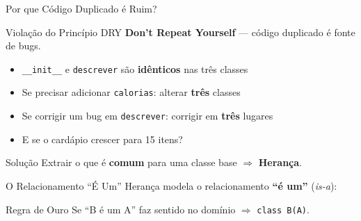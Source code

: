 \documentclass[aspectratio=169]{beamer}
\begin{document}
\begin{frame}{Por que Código Duplicado é Ruim?}
  \begin{alertblock}{Violação do Princípio DRY}
    \textbf{Don't Repeat Yourself} --- código duplicado é fonte de bugs.
  \end{alertblock}

  \bigskip

  \begin{itemize}
    \item \texttt{\_\_init\_\_} e \texttt{descrever} são \textbf{idênticos} nas três classes
    \item Se precisar adicionar \texttt{calorias}: alterar \textbf{três} classes
    \item Se corrigir um bug em \texttt{descrever}: corrigir em \textbf{três} lugares
    \item E se o cardápio crescer para 15 itens?
  \end{itemize}

  \bigskip

  \begin{exampleblock}{Solução}
    Extrair o que é \textbf{comum} para uma classe base $\Rightarrow$ \textbf{Herança}.
  \end{exampleblock}
\end{frame}

\begin{frame}[shrink]{O Relacionamento ``É Um''}
  Herança modela o relacionamento \textbf{``é um''} (\emph{is-a}):

  \medskip


  \medskip

  \begin{alertblock}{Regra de Ouro}
    Se ``B é um A'' faz sentido no domínio $\Rightarrow$ \texttt{class B(A)}.
  \end{alertblock}
\end{frame}
\end{document}
